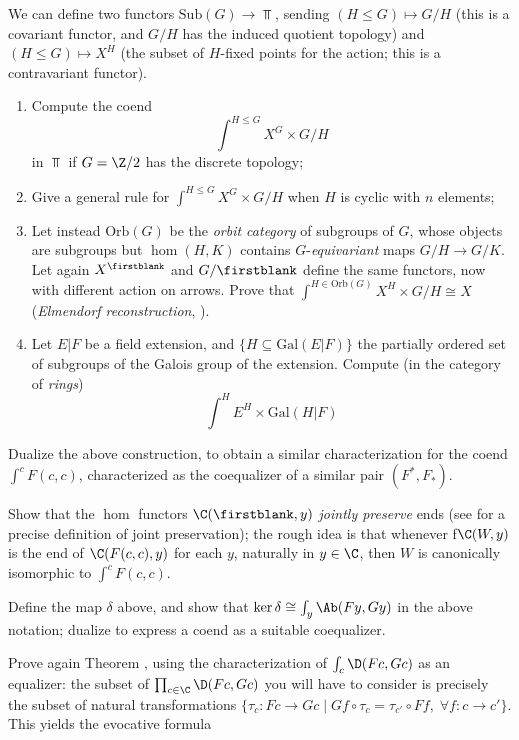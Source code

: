 \begin{exerciseset}
\begin{exercisepoints}
We can define two functors $\text{Sub}(G) \to \Top$, sending $(H\le G) \mapsto G/H$ (this is a covariant functor, and $G/H$ has the induced quotient topology) and $(H\le G)\mapsto X^H$ (the subset of $H$-fixed points for the action; this is a contravariant functor).
\begin{enumerate}
\item Compute the coend 
\[
\int^{H\le G} X^G \times G/H
\] 
in $\Top$ if $G = \Z/2$ has the discrete topology;
\item Give a general rule for $\int^{H\le G} X^G \times G/H$ when $H$ is cyclic with $n$ elements;
\item Let instead $\text{Orb}(G)$ be the \emph{orbit category} of subgroups of $G$, whose objects are subgroups but $\hom(H,K)$ contains $G$-\emph{equivariant} maps $G/H \to G/K$. Let again $X^{\firstblank}$ and $G/\firstblank$ define the same functors, now with different action on arrows. Prove that $\int^{H\in\text{Orb}(G)} X^H \times G/H \cong X$ (\emph{Elmendorf reconstruction}, \cite{Elmendorf1983}).
\item Let $E|F$ be a field extension, and $\{H \subseteq \text{Gal}(E|F)\}$ the partially ordered set of subgroups of the Galois group of the extension. Compute (in the category of \emph{rings})
\[
\int^{H} E^H \times \text{Gal}(H|F)
\]
\end{enumerate}
\item \label{ex1:iscoeq} Dualize the above construction, to obtain a similar characterization for the coend $\int^c F(c,c)$, characterized as the coequalizer of a similar pair $(F^*, F_*)$.
\item \label{ex1:jointlypreserve} Show that the $\hom$ functors $\C(\firstblank,y)$ \emph{jointly preserve} ends (see \cite{McL} for a precise definition of joint preservation); the rough idea is that whenever f$\C(W,y)$ is the end of $\C(F(c,c),y)$ for each $y$, naturally in $y\in\C$, then $W$ is canonically isomorphic to $\int^c F(c,c)$.
\item Define the map $\delta$ above, and show that $\ker\delta\cong \int_y \Ab(Fy, Gy)$ in the above notation; dualize to express a coend as a suitable coequalizer.
\item \label{ex1:niftynat} Prove again Theorem , using the characterization of $\int_c\D(Fc,Gc)$ as an equalizer: the subset of $\prod_{c\in\C} \D(Fc,Gc)$ you will have to consider is precisely the subset of natural transformations $\{\tau_c\colon Fc\to Gc\mid Gf\circ \tau_c = \tau_{c'}\circ Ff,\;\forall f\colon c\to c'\}$.
This yields the evocative formula

\end{exercisepoints}
\end{exerciseset}

